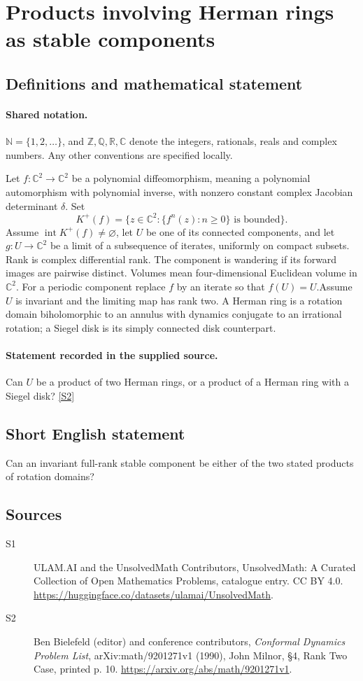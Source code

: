 \documentclass[11pt]{article}
\newcommand{\sref}[2]{\hyperlink{source:#1:#2}{[S#2]}}
\begin{document}
\section{Products involving Herman rings as stable components}\label{statement}

\subsection{Definitions and mathematical statement}

\paragraph{Shared notation.}$\mathbb N=\{1,2,\ldots\}$, and $\mathbb Z,\mathbb Q,\mathbb R,\mathbb C$ denote the integers, rationals, reals and complex numbers. Any other conventions are specified locally.


Let $f:\mathbb C^2\to\mathbb C^2$ be a polynomial diffeomorphism, meaning a polynomial automorphism with polynomial inverse, with nonzero constant complex Jacobian determinant $\delta$. Set
\[K^+(f)=\{z\in\mathbb C^2:\{f^n(z):n\geq0\}\text{ is bounded}\}.\]
Assume $\operatorname{int}K^+(f)\ne\varnothing$, let $U$ be one of its connected components, and let $g:U\to\mathbb C^2$ be a limit of a subsequence of iterates, uniformly on compact subsets. Rank is complex differential rank. The component is wandering if its forward images are pairwise distinct. Volumes mean four-dimensional Euclidean volume in $\mathbb C^2$. For a periodic component replace $f$ by an iterate so that $f(U)=U$.Assume $U$ is invariant and the limiting map has rank two. A Herman ring is a rotation domain biholomorphic to an annulus with dynamics conjugate to an irrational rotation; a Siegel disk is its simply connected disk counterpart.
\paragraph{Statement recorded in the supplied source.}
Can $U$ be a product of two Herman rings, or a product of a Herman ring with a Siegel disk? \sref{statement}{2}
\subsection{Short English statement}
Can an invariant full-rank stable component be either of the two stated products of rotation domains?
\subsection{Sources}
\begin{description}
\item[\hypertarget{source:statement:1}{S1}] ULAM.AI and the UnsolvedMath Contributors, UnsolvedMath: A Curated Collection of Open Mathematics Problems, catalogue entry. CC BY 4.0. \url{https://huggingface.co/datasets/ulamai/UnsolvedMath}.
\item[\hypertarget{source:statement:2}{S2}] Ben Bielefeld (editor) and conference contributors, \emph{Conformal Dynamics Problem List}, arXiv:math/9201271v1 (1990), John Milnor, \S4, Rank Two Case, printed p. 10. \url{https://arxiv.org/abs/math/9201271v1}.
\end{description}
\label{end:statement}
\end{document}
